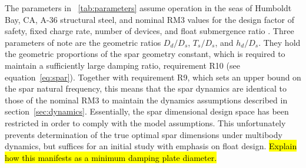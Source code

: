 The parameters in \tablename~\ref{tab:parameters} assume operation in the seas of Humboldt Bay, CA, A-36 structural steel, and nominal RM3 values for the design factor of safety, fixed charge rate, number of devices, and float submergence ratio \cite{RM3}.
Three parameters of note are the geometric ratios $D_d/D_s$, $T_s/D_s$, and $h_d/D_s$.
They hold the geometric proportions of the spar geometry constant, which is required to maintain a sufficiently large damping ratio, requirement R10 (see equation~\eqref{eq:spar}).
Together with requirement R9, which sets an upper bound on the spar natural frequency, this means that the spar dynamics are identical to those of the nominal RM3 to maintain the dynamics assumptions described in section~\ref{sec:dynamics}.
Essentially, the spar dimensional design space has been restricted in order to comply with the model assumptions.
This unfortunately prevents determination of the true optimal spar dimensions under multibody dynamics, but suffices for an initial study with emphasis on float design.
\hl{Explain how this manifests as a minimum damping plate diameter.}

